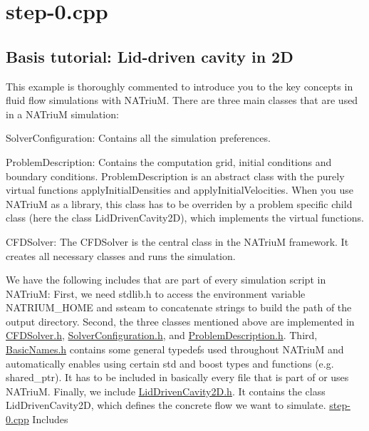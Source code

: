 \hypertarget{step-0_8cpp-example}{
\section{step-\/0.cpp}
}
\hypertarget{/mnt/fdrive/akraem3m/workspace/NATriuM/src/examples/step-0/step-0.cpp_sec_intro}{}\subsection{Basis tutorial: Lid-\/driven cavity in 2D}\label{/mnt/fdrive/akraem3m/workspace/NATriuM/src/examples/step-0/step-0.cpp_sec_intro}
This example is thoroughly commented to introduce you to the key concepts in fluid flow simulations with NATriuM. There are three main classes that are used in a NATriuM simulation:
\begin{DoxyItemize}
\item SolverConfiguration: Contains all the simulation preferences.
\item ProblemDescription: Contains the computation grid, initial conditions and boundary conditions. ProblemDescription is an abstract class with the purely virtual functions applyInitialDensities and applyInitialVelocities. When you use NATriuM as a library, this class has to be overriden by a problem specific child class (here the class LidDrivenCavity2D), which implements the virtual functions.
\item CFDSolver: The CFDSolver is the central class in the NATriuM framework. It creates all necessary classes and runs the simulation.
\end{DoxyItemize}

We have the following includes that are part of every simulation script in NATriuM: First, we need stdlib.h to access the environment variable NATRIUM\_\-HOME and ssteam to concatenate strings to build the path of the output directory. Second, the three classes mentioned above are implemented in \hyperlink{CFDSolver_8h}{CFDSolver.h}, \hyperlink{SolverConfiguration_8h}{SolverConfiguration.h}, and \hyperlink{ProblemDescription_8h}{ProblemDescription.h}. Third, \hyperlink{BasicNames_8h}{BasicNames.h} contains some general typedefs used throughout NATriuM and automatically enables using certain std and boost types and functions (e.g. shared\_\-ptr). It has to be included in basically every file that is part of or uses NATriuM. Finally, we include \hyperlink{LidDrivenCavity2D_8h}{LidDrivenCavity2D.h}. It contains the class LidDrivenCavity2D, which defines the concrete flow we want to simulate.  \hyperlink{step-0_8cpp}{step-\/0.cpp} Includes

